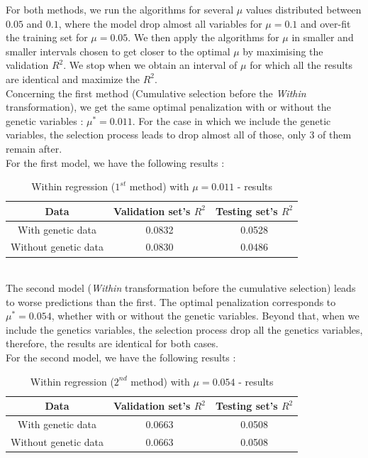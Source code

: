 \documentclass[]{article}
\begin{document}
\noindent
For both methods, we run the algorithms for several $\mu$ values distributed between $0.05$ and $0.1$, where the model drop almost all variables for $\mu = 0.1$ and over-fit the training set for $\mu = 0.05$. We then apply the algorithms for $\mu$ in smaller and smaller intervals chosen to get closer to the optimal $\mu$ by maximising the validation $R^2$. We stop when we obtain an interval of $\mu$ for which all the results are identical and maximize the $R^2$.\\

\noindent
Concerning the first method (Cumulative selection before the \textit{Within} transformation), we get the same optimal penalization with or without the genetic variables : $\mu^* = 0.011$. For the case in which we include the genetic variables, the selection process leads to drop almost all of those, only 3 of them remain after.\\

\noindent
For the first model, we have the following results :
\begin{table}[!h]
    \centering
    \begin{tabular}{|c|c|c|}
	   \hline
	   \textbf{Data} & \textbf{Validation set's $R^2$} & \textbf{Testing set's $R^2$} \\
	   \hline
	   With genetic data & 0.0832 & 0.0528  \\ 
	   \hline
	   Without genetic data & 0.0830 & 0.0486 \\
	   \hline 
    \end{tabular}
    \caption{Within regression ($1^{st}$ method) with $\mu = 0.011$ - results}
    \label{results_Within_1}
\end{table}\\

\noindent
The second model (\textit{Within} transformation before the cumulative selection) leads to worse predictions than the first. The optimal penalization corresponds to $\mu^* = 0.054$, whether with or without the genetic variables. Beyond that, when we include the genetics variables, the selection process drop all the genetics variables, therefore, the results are identical for both cases.\\

\noindent
For the second model, we have the following results :
\begin{table}[!h]
    \centering
    \begin{tabular}{|c|c|c|}
	   \hline
	   \textbf{Data} & \textbf{Validation set's $R^2$} & \textbf{Testing set's $R^2$} \\
	   \hline
	   With genetic data & 0.0663 & 0.0508  \\ 
	   \hline
	   Without genetic data & 0.0663 & 0.0508 \\
	   \hline 
    \end{tabular}
    \caption{Within regression ($2^{nd}$ method) with $\mu = 0.054$ - results}
    \label{results_Within_2}
\end{table}\\
\end{document}

